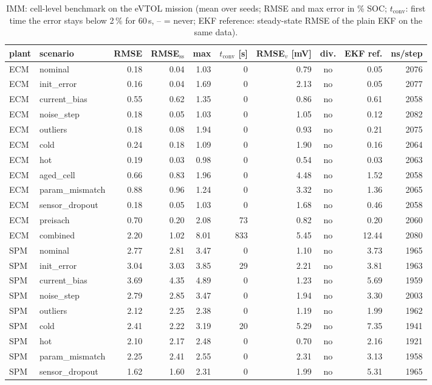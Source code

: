 \begin{table}[H]\centering\footnotesize\setlength{\tabcolsep}{4pt}
\caption{IMM: cell-level benchmark on the eVTOL mission (mean over seeds; RMSE and max error in \% SOC; $t_\mathrm{conv}$: first time the error stays below 2\,\% for 60\,s, -- = never; EKF reference: steady-state RMSE of the plain EKF on the same data).}\label{tab:cell_IMM}
\begin{tabular}{llrrrrrcrr}\toprule
plant & scenario & RMSE & RMSE$_\mathrm{ss}$ & max & $t_\mathrm{conv}$ [s] & RMSE$_v$ [mV] & div. & EKF ref. & ns/step \\ \midrule
ECM & nominal & 0.18 & 0.04 & 1.03 & 0 & 0.79 & no & 0.05 & 2076 \\
ECM & init\_error & 0.16 & 0.04 & 1.69 & 0 & 2.13 & no & 0.05 & 2077 \\
ECM & current\_bias & 0.55 & 0.62 & 1.35 & 0 & 0.86 & no & 0.61 & 2058 \\
ECM & noise\_step & 0.18 & 0.05 & 1.03 & 0 & 1.05 & no & 0.12 & 2082 \\
ECM & outliers & 0.18 & 0.08 & 1.94 & 0 & 0.93 & no & 0.21 & 2075 \\
ECM & cold & 0.24 & 0.18 & 1.09 & 0 & 1.90 & no & 0.16 & 2064 \\
ECM & hot & 0.19 & 0.03 & 0.98 & 0 & 0.54 & no & 0.03 & 2063 \\
ECM & aged\_cell & 0.66 & 0.83 & 1.96 & 0 & 4.48 & no & 1.52 & 2058 \\
ECM & param\_mismatch & 0.88 & 0.96 & 1.24 & 0 & 3.32 & no & 1.36 & 2065 \\
ECM & sensor\_dropout & 0.18 & 0.05 & 1.03 & 0 & 1.68 & no & 0.46 & 2058 \\
ECM & preisach & 0.70 & 0.20 & 2.08 & 73 & 0.82 & no & 0.20 & 2060 \\
ECM & combined & 2.20 & 1.02 & 8.01 & 833 & 5.45 & no & 12.44 & 2080 \\
\midrule
SPM & nominal & 2.77 & 2.81 & 3.47 & 0 & 1.10 & no & 3.73 & 1965 \\
SPM & init\_error & 3.04 & 3.03 & 3.85 & 29 & 2.21 & no & 3.81 & 1963 \\
SPM & current\_bias & 3.69 & 4.35 & 4.89 & 0 & 1.23 & no & 5.69 & 1959 \\
SPM & noise\_step & 2.79 & 2.85 & 3.47 & 0 & 1.94 & no & 3.30 & 2003 \\
SPM & outliers & 2.12 & 2.25 & 2.38 & 0 & 1.19 & no & 1.99 & 1962 \\
SPM & cold & 2.41 & 2.22 & 3.19 & 20 & 5.29 & no & 7.35 & 1941 \\
SPM & hot & 2.10 & 2.17 & 2.48 & 0 & 0.70 & no & 2.16 & 1921 \\
SPM & param\_mismatch & 2.25 & 2.41 & 2.55 & 0 & 2.31 & no & 3.13 & 1958 \\
SPM & sensor\_dropout & 1.62 & 1.60 & 2.31 & 0 & 1.99 & no & 5.31 & 1965 \\
\bottomrule\end{tabular}\end{table}
